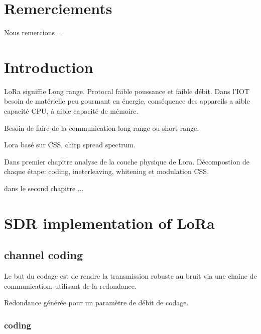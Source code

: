 \documentclass[12pt,a4paper,oneside, titlepage]{report}
\begin{document}
{}
\chapter*{Remerciements}
\renewcommand{\leftmark}{REMERCIEMENTS}

Nous remercions ...\\

\newpage
\renewcommand{\leftmark}{TABLE DES MATI\`{E}RES}
\thispagestyle{fancy}
\tableofcontents


\newpage
{}
\renewcommand{\leftmark}{INTRODUCTION}
\chapter{Introduction}

LoRa signiffie Long range. Protocal faible poussance et faible débit. Dans l'IOT besoin de matérielle peu gourmant en énergie, conséquence des appareils a aible capacité CPU, à aible capacité de mémoire.

Besoin de faire de la communication long range ou short range.

Lora basé sur CSS, chirp spread spectrum.

Dans premier chapitre analyse de la couche physique de Lora. Décompostion de chaque étape: coding, ineterleaving, whitening et modulation CSS. 

dans le second chapitre ... 


\newpage


\chapter{SDR implementation of LoRa}\label{ch:1}
\renewcommand{\leftmark}{CHAPITRE \thechapter.~~Physical LoRa}

\section{channel coding}

Le but du codage est de rendre la transmission robuste au bruit via une chaine de communication, utilisant de la redondance.

Redondance générée pour un paramètre de débit de codage.


\subsection{coding}
\end{document}
